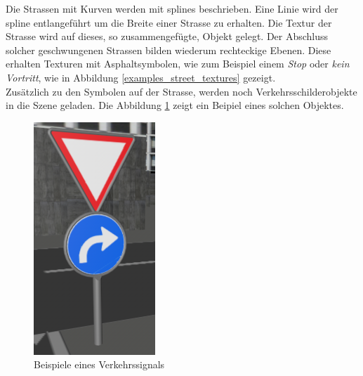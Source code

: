 Die Strassen mit Kurven werden mit \glspl{spline} beschrieben. Eine Linie wird der \gls{spline} entlangeführt um die Breite einer Strasse zu erhalten. Die Textur der Strasse wird auf dieses, so zusammengefügte, Objekt gelegt. Der Abschluss solcher geschwungenen Strassen bilden wiederum rechteckige Ebenen. Diese erhalten Texturen mit Asphaltsymbolen, wie zum Beispiel einem \textit{Stop} oder \textit{kein Vortritt}, wie in Abbildung \ref{examples_street_textures} gezeigt. \\
Zusätzlich zu den Symbolen auf der Strasse, werden noch Verkehrsschilderobjekte in die Szene geladen. Die Abbildung \ref{screenshot_trafficsignal} zeigt ein Beipiel eines solchen Objektes. \\
\begin{figure}[H]
\centering 
\includegraphics[scale=0.6]{src/screenshot_trafficsignal.png}
\caption{Beispiele eines Verkehrssignals} %
\label{screenshot_trafficsignal} %
\end{figure}

